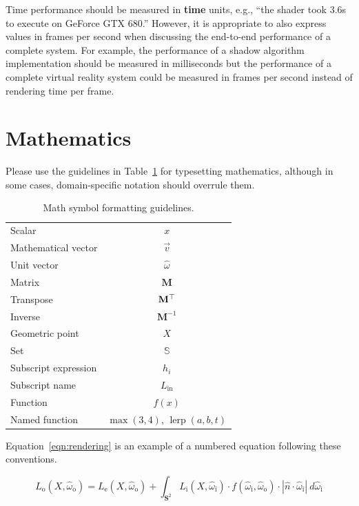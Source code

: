 \documentclass{jcgt}
\begin{document}
Time performance should be measured in \textbf{time} units, e.g., ``the shader took 3.6\;s to execute on GeForce GTX 680.''  However, it is appropriate to also express values in frames per second when discussing the end-to-end performance of a complete system.  For example, the performance of a shadow algorithm implementation should be measured in milliseconds but the performance of a complete virtual reality system could be measured in frames per second instead of rendering time per frame.

\section{Mathematics}
Please use the guidelines in Table~\ref{tbl:math} for typesetting mathematics, although in some cases, domain-specific notation should overrule them.

\begin{table}[htp]
\small
\begin{center}
\begin{tabular}{l|c}
Scalar & $x$\\
Mathematical vector & $\vec{v}$ \\
Unit vector & $\hat{\omega}$ \\
Matrix & $\mathbf{M}$ \\
Transpose & $\mathbf{M}^\top$\\
Inverse & $\mathbf{M}^{-1}$\\
Geometric point & $X$ \\
Set & $\mathbb{S}$ \\
Subscript expression & $h_i$ \\
Subscript name & $L_\mathrm{in}$ \\
Function & $f(x)$ \\
Named function & $\max(3, 4)$, $\operatorname{lerp}(a, b, t)$
\end{tabular}
\end{center}
\caption{Math symbol formatting guidelines.}
\label{tbl:math}
\end{table}

\noindent Equation~\ref{eqn:rendering} is an example of a numbered equation following these conventions.

\begin{equation}
L_\mathrm{o}(X, \hat{\omega}_\mathrm{o}) = L_\mathrm{e}(X, \hat{\omega}_\mathrm{o}) + \int_{\mathbf{S}^2} L_\mathrm{i}(X, \hat{\omega}_\mathrm{i}) \cdot f(\hat{\omega}_\mathrm{i}, \hat{\omega}_\mathrm{o}) \cdot |\hat{n} \cdot \hat{\omega}_\mathrm{i} |~ d\hat{\omega}_\mathrm{i}
\label{eqn:rendering}
\end{equation}
\end{document}
